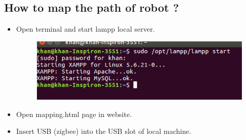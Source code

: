 \documentclass[11pt,a4paper]{article}
\begin{document}
	  \subsection{How to map the path of robot ?}
	 \begin{itemize}
	 \item Open terminal and start lampp local server.
	 
	 	\begin{figure}[h]
    \centering
	\includegraphics[scale=0.5]{lampstart.png}
	\end{figure}
	 
	 \item Open mapping.html page in website.
	 \item  Insert USB (zigbee) into the USB slot of local machine.
	  

\end{itemize}
\end{document}

